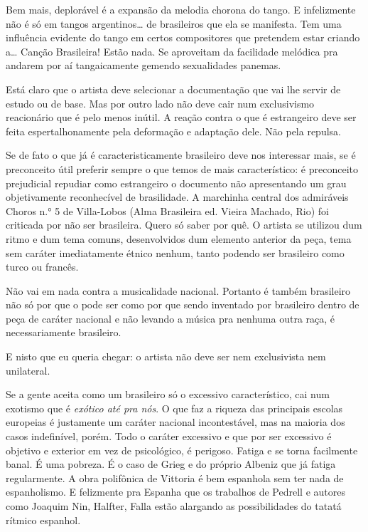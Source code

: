 Bem mais, deplorável é a expansão da melodia chorona do tango. E
infelizmente não é só em tangos argentinos\ldots{} de brasileiros que ela se
manifesta. Tem uma influência evidente do tango em certos compositores
que pretendem estar criando a\ldots{} Canção Brasileira! Estão nada. Se
aproveitam da facilidade melódica pra andarem por aí tangaicamente
gemendo sexualidades panemas.

Está claro que o artista deve selecionar a documentação que vai lhe
servir de estudo ou de base. Mas por outro lado não deve cair num
exclusivismo reacionário que é pelo menos inútil. A reação contra o que
é estrangeiro deve ser feita espertalhonamente pela deformação e
adaptação dele. Não pela repulsa.

Se de fato o que já é caracteristicamente brasileiro deve nos interessar
mais, se é preconceito útil preferir sempre o que temos de mais
característico: é preconceito prejudicial repudiar como estrangeiro o
documento não apresentando um grau objetivamente reconhecível de
brasilidade. A marchinha central dos admiráveis Choros n.° 5 de
Villa-Lobos (Alma Brasileira ed. Vieira Machado, Rio) foi criticada por
não ser brasileira. Quero só saber por quê. O artista se utilizou dum
ritmo e dum tema comuns, desenvolvidos dum elemento anterior da peça,
tema sem caráter imediatamente étnico nenhum, tanto podendo ser
brasileiro como turco ou francês.

Não vai em nada contra a musicalidade nacional. Portanto é também
brasileiro não só por que o pode ser como por que sendo inventado por
brasileiro dentro de peça de caráter nacional e não levando a música pra
nenhuma outra raça, é necessariamente brasileiro.

E nisto que eu queria chegar: o artista não deve ser nem exclusivista
nem unilateral.

Se a gente aceita como um brasileiro só o excessivo característico, cai
num exotismo que é \emph{exótico até pra nós}. O que faz a riqueza das
principais escolas europeias é justamente um caráter nacional
incontestável, mas na maioria dos casos indefinível, porém. Todo o
caráter excessivo e que por ser excessivo é objetivo e exterior em vez
de psicológico, é perigoso. Fatiga e se torna facilmente banal. É uma
pobreza. É o caso de Grieg e do próprio Albeniz que já fatiga
regularmente. A obra polifônica de Vittoria é bem espanhola sem ter nada
de espanholismo. E felizmente pra Espanha que os trabalhos de Pedrell e
autores como Joaquim Nin, Halfter, Falla estão alargando as
possibilidades do tatatá rítmico espanhol.

